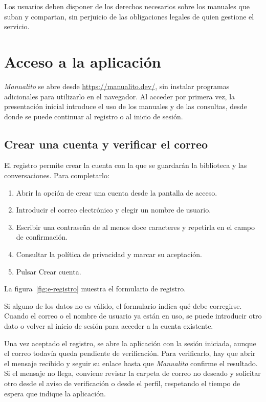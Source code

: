 Los usuarios deben disponer de los derechos necesarios sobre los manuales
que suban y compartan, sin perjuicio de las obligaciones legales de quien
gestione el servicio.

\section{Acceso a la aplicación}
\label{sec:e-acceso}

\textit{Manualito} se abre desde \url{https://manualito.dev/}, sin instalar
programas adicionales para utilizarlo en el navegador. Al acceder por
primera vez, la presentación inicial introduce el uso de los manuales y de
las consultas, desde donde se puede continuar al registro o al inicio de
sesión.

\subsection{Crear una cuenta y verificar el correo}
\label{sec:e-registro}

El registro permite crear la cuenta con la que se guardarán la biblioteca y
las conversaciones. Para completarlo:

\begin{enumerate}
    \item Abrir la opción de crear una cuenta desde la pantalla de acceso.
    \item Introducir el correo electrónico y elegir un nombre de usuario.
    \item Escribir una contraseña de al menos doce caracteres y repetirla
    en el campo de confirmación.
    \item Consultar la política de privacidad y marcar su aceptación.
    \item Pulsar \guillemotleft{}Crear cuenta\guillemotright{}.
\end{enumerate}

La figura~\ref{fig:e-registro} muestra el formulario de registro.


Si alguno de los datos no es válido, el formulario indica qué debe
corregirse. Cuando el correo o el nombre de usuario ya están en uso, se
puede introducir otro dato o volver al inicio de sesión para acceder a la
cuenta existente.

Una vez aceptado el registro, se abre la aplicación con la sesión iniciada,
aunque el correo todavía queda pendiente de verificación. Para verificarlo,
hay que abrir el mensaje recibido y seguir su enlace hasta que
\textit{Manualito} confirme el resultado. Si el mensaje no llega, conviene
revisar la carpeta de correo no deseado y solicitar otro desde el aviso de
verificación o desde el perfil, respetando el tiempo de espera que indique
la aplicación.

